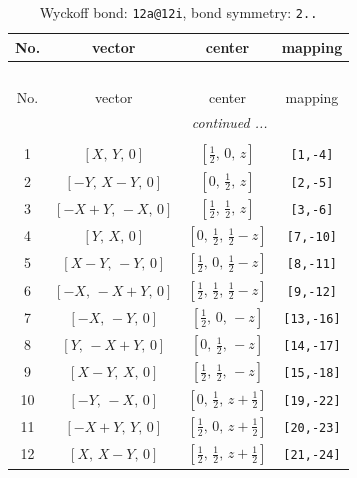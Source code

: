 \documentclass[fleqn,8pt]{jsarticle}
\begin{document}
\begin{longtable}{cccc}
\caption{Wyckoff bond: {\tt 12a@12i}, bond symmetry: {\tt 2..}}
 \\
 \hline \hline
No. & vector & center & mapping \\ \hline \endfirsthead

\multicolumn{3}{l}{\tablename\ \thetable{}} \\
 \hline \hline
No. & vector & center & mapping \\ \hline \endhead

 \hline \hline
\multicolumn{3}{r}{\footnotesize\it continued ...} \\ \endfoot

 \hline \hline
\multicolumn{3}{r}{} \\ \endlastfoot

1 & $\left[ X,\, Y,\, 0 \right]$ & $\left[ \frac{1}{2},\, 0,\, z \right]$ & {\tt [1,-4]} \\ \hline
2 & $\left[ - Y,\, X - Y,\, 0 \right]$ & $\left[ 0,\, \frac{1}{2},\, z \right]$ & {\tt [2,-5]} \\ \hline
3 & $\left[ - X + Y,\, - X,\, 0 \right]$ & $\left[ \frac{1}{2},\, \frac{1}{2},\, z \right]$ & {\tt [3,-6]} \\ \hline
4 & $\left[ Y,\, X,\, 0 \right]$ & $\left[ 0,\, \frac{1}{2},\, \frac{1}{2} - z \right]$ & {\tt [7,-10]} \\ \hline
5 & $\left[ X - Y,\, - Y,\, 0 \right]$ & $\left[ \frac{1}{2},\, 0,\, \frac{1}{2} - z \right]$ & {\tt [8,-11]} \\ \hline
6 & $\left[ - X,\, - X + Y,\, 0 \right]$ & $\left[ \frac{1}{2},\, \frac{1}{2},\, \frac{1}{2} - z \right]$ & {\tt [9,-12]} \\ \hline
7 & $\left[ - X,\, - Y,\, 0 \right]$ & $\left[ \frac{1}{2},\, 0,\, - z \right]$ & {\tt [13,-16]} \\ \hline
8 & $\left[ Y,\, - X + Y,\, 0 \right]$ & $\left[ 0,\, \frac{1}{2},\, - z \right]$ & {\tt [14,-17]} \\ \hline
9 & $\left[ X - Y,\, X,\, 0 \right]$ & $\left[ \frac{1}{2},\, \frac{1}{2},\, - z \right]$ & {\tt [15,-18]} \\ \hline
10 & $\left[ - Y,\, - X,\, 0 \right]$ & $\left[ 0,\, \frac{1}{2},\, z + \frac{1}{2} \right]$ & {\tt [19,-22]} \\ \hline
11 & $\left[ - X + Y,\, Y,\, 0 \right]$ & $\left[ \frac{1}{2},\, 0,\, z + \frac{1}{2} \right]$ & {\tt [20,-23]} \\ \hline
12 & $\left[ X,\, X - Y,\, 0 \right]$ & $\left[ \frac{1}{2},\, \frac{1}{2},\, z + \frac{1}{2} \right]$ & {\tt [21,-24]} \\
\end{longtable}
\end{document}
